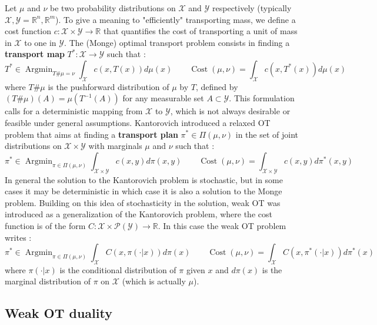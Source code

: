 \documentclass[11pt]{article}
\newcommand{\R}{\mathbb{R}}
\DeclareMathOperator*{\Argmin}{\text{Argmin}}
\DeclareMathOperator*{\Cost}{\text{Cost}}
\begin{document}
Let $\mu$ and $\nu$ be two probability distributions on $\mathcal{X}$ and $\mathcal{Y}$ respectively (typically $\mathcal{X}, \mathcal{Y}=\R^n,\R^m$). To give a meaning to "efficiently" transporting mass, we define a cost function $c:\mathcal{X}\times\mathcal{Y}\to\R$ that quantifies the cost of transporting a unit of mass in $\mathcal{X}$ to one in $\mathcal{Y}$. The (Monge) optimal transport problem consists in finding a \textbf{transport map} $T^*:\mathcal{X}\to \mathcal{Y}$ such that :
\begin{equation}
    T^* \in \Argmin_{T\#\mu=\nu} \int_{\mathcal{X}} c(x,T(x))d\mu(x) \quad\quad \Cost(\mu,\nu) = \int_{\mathcal{X}} c(x,T^*(x))d\mu(x)
\end{equation}
where $T\#\mu$ is the pushforward distribution of $\mu$ by $T$, defined by $(T\#\mu)(A)=\mu(T^{-1}(A))$ for any measurable set $A\subset\mathcal{Y}$. This formulation calls for a deterministic mapping from $\mathcal{X}$ to $\mathcal{Y}$, which is not always desirable or feasible under general assumptions. Kantorovich introduced  a relaxed OT problem that aims at finding a \textbf{transport plan} $\pi^*\in \Pi(\mu,\nu)$ in the set of joint distributions on $\mathcal{X}\times\mathcal{Y}$ with marginals $\mu$ and $\nu$ such that :
\begin{equation}
    \pi^* \in \Argmin_{\pi\in\Pi(\mu,\nu)} \int_{\mathcal{X}\times\mathcal{Y}} c(x,y)d\pi(x,y) \quad\quad \Cost(\mu,\nu) = \int_{\mathcal{X}\times\mathcal{Y}} c(x,y)d\pi^*(x,y)
\end{equation}
In general the solution to the Kantorovich problem is stochastic, but in some cases it may be deterministic in which case it is also a solution to the Monge problem. Building on this idea of stochasticity in the solution, weak OT was introduced as a generalization of the Kantorovich problem, where the cost function is of the form $C: \mathcal{X}\times \mathcal{P}(\mathcal{Y})\to\R$. In this case the weak OT problem writes :
\begin{equation}
    \pi^* \in \Argmin_{\pi\in\Pi(\mu,\nu)} \int_{\mathcal{X}} C(x,\pi(\cdot|x))d\pi(x) \quad\quad \Cost(\mu,\nu) = \int_{\mathcal{X}} C(x,\pi^*(\cdot|x))d\pi^*(x)
\end{equation}
where $\pi(\cdot|x)$ is the conditional distribution of $\pi$ given $x$ and $d\pi(x)$ is the marginal distribution of $\pi$ on $\mathcal{X}$ (which is actually $\mu$).

\subsection{Weak OT duality}
\end{document}
